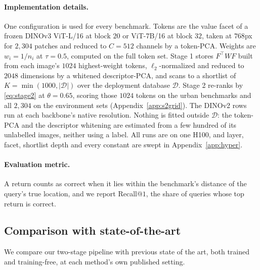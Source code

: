 \paragraph{Implementation details.} One configuration is used for every benchmark. Tokens are the value facet of a frozen DINOv3 ViT-L/16 at block $20$ or ViT-7B/16 at block $32$, taken at $768$px for $2{,}304$ patches and reduced to $C{=}512$ channels by a token-PCA. Weights are $w_i{=}1/n_i$ at $\tau{=}0.5$, computed on the full token set. Stage 1 stores $F^{\top}WF$ built from each image's $1024$ highest-weight tokens, $\ell_2$-normalized and reduced to $2048$ dimensions by a whitened descriptor-PCA, and scans to a shortlist of $K{=}\min(1000,|\mathcal{D}|)$ over the deployment database $\mathcal{D}$. Stage 2 re-ranks by \eqref{eq:stage2} at $\theta{=}0.65$, scoring those $1024$ tokens on the urban benchmarks and all $2{,}304$ on the environment sets (Appendix~\ref{app:s2grid}). The DINOv2 rows run at each backbone's native resolution. Nothing is fitted outside $\mathcal{D}$: the token-PCA and the descriptor whitening are estimated from a few hundred of its unlabelled images, neither using a label. All runs are on one H100, and layer, facet, shortlist depth and every constant are swept in Appendix~\ref{app:hyper}.

\paragraph{Evaluation metric.} A return counts as correct when it lies within the benchmark's distance of the query's true location, and we report Recall@$1$, the share of queries whose top return is correct.

\subsection{Comparison with state-of-the-art}
\label{sec:sota}
We compare our two-stage pipeline with previous state of the art, both trained and training-free, at each method's own published setting.

